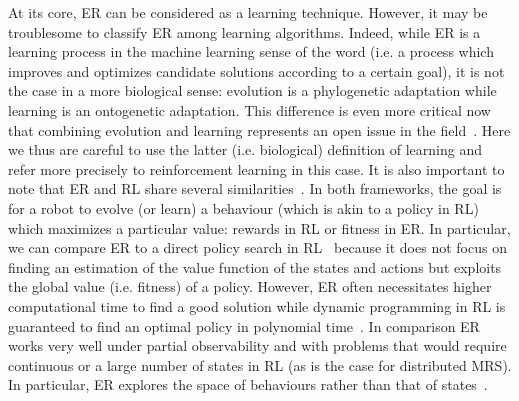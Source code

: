     At its core, ER can be considered as a learning technique. However, it may be troublesome to classify ER among learning algorithms. Indeed, while ER is a learning process in the machine learning sense of the word (i.e. a process which improves and optimizes candidate solutions according to a certain goal), it is not the case in a more biological sense: evolution is a phylogenetic adaptation while learning is an ontogenetic adaptation. This difference is even more critical now that combining evolution and learning represents an open issue in the field~\parencite{Urzelai2001, Mouret2014, Doncieux2015a}. Here we thus are careful to use the latter (i.e. biological) definition of learning and refer more precisely to reinforcement learning in this case. It is also important to note that ER and RL share several similarities~\parencite{Whiteson2012, Stulp2013, Doncieux2015a}. In both frameworks, the goal is for a robot to evolve (or learn) a behaviour (which is akin to a policy in RL) which maximizes a particular value: rewards in RL or fitness in ER. In particular, we can compare ER to a direct policy search in RL~\parencite{Kober2013} because it does not focus on finding an estimation of the value function of the states and actions but exploits the global value (i.e. fitness) of a policy. However, ER often necessitates higher computational time to find a good solution while dynamic programming in RL is guaranteed to find an optimal policy in polynomial time~\parencite{Littman1994, Whiteson2012}. In comparison ER works very well under partial observability and with problems that would require continuous or a large number of states in RL (as is the case for distributed MRS). In particular, ER explores the space of behaviours rather than that of states~\parencite{Panait2005}.


